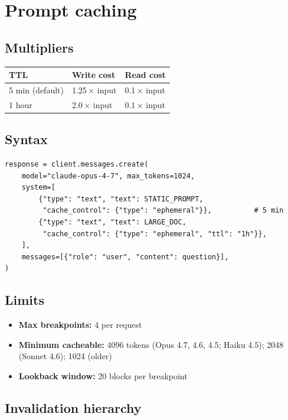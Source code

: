\documentclass[11pt,a4paper]{article}
\begin{document}
\section{Prompt caching}

\subsection{Multipliers}

\begin{tabular}{lll}
\hline
\textbf{TTL} & \textbf{Write cost} & \textbf{Read cost} \\
\hline
5 min (default) & 1.25\,$\times$ input & 0.1\,$\times$ input \\
1 hour & 2.0\,$\times$ input & 0.1\,$\times$ input \\
\hline
\end{tabular}

\subsection{Syntax}

\begin{lstlisting}[language=python2]
response = client.messages.create(
    model="claude-opus-4-7", max_tokens=1024,
    system=[
        {"type": "text", "text": STATIC_PROMPT,
         "cache_control": {"type": "ephemeral"}},          # 5 min
        {"type": "text", "text": LARGE_DOC,
         "cache_control": {"type": "ephemeral", "ttl": "1h"}},
    ],
    messages=[{"role": "user", "content": question}],
)
\end{lstlisting}

\subsection{Limits}

\begin{itemize}
\item \textbf{Max breakpoints:} 4 per request
\item \textbf{Minimum cacheable:} 4096 tokens (Opus 4.7, 4.6, 4.5; Haiku 4.5); 2048 (Sonnet 4.6); 1024 (older)
\item \textbf{Lookback window:} 20 blocks per breakpoint
\end{itemize}

\subsection{Invalidation hierarchy}
\end{document}
